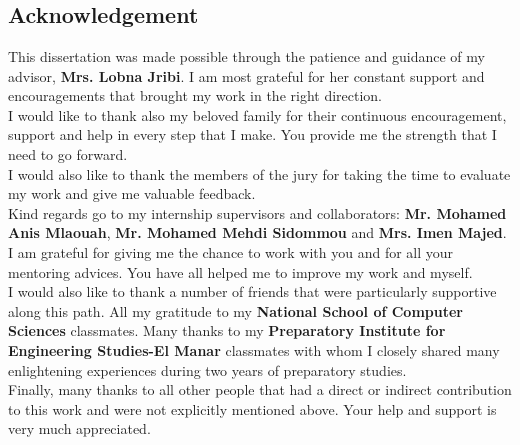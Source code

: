 \chapter*{}



\hskip7mm



\begin{center}
\section*{Acknowledgement}

\end{center}

\begin{spacing}{1.3}
This dissertation was made possible through the patience and guidance of my advisor, \textbf{Mrs. Lobna Jribi}. I am most grateful for her constant support and encouragements that brought my work in the right direction.\\

I would like to thank also my beloved family for their continuous encouragement, support and help in every step that I make. You provide me the strength that I need to go forward.\\

I would also like to thank the members of the jury for taking the time to evaluate my work and give me valuable feedback.\\

Kind regards go to my internship supervisors and collaborators: \textbf{Mr. Mohamed Anis Mlaouah}, \textbf{Mr. Mohamed Mehdi Sidommou} and \textbf{Mrs. Imen Majed}. I am grateful for giving me the chance to work with you and for all your mentoring advices. You have all helped me to improve my work and myself.\\

I would also like to thank a number of friends that were particularly supportive along this path. All my gratitude to my \textbf{National School of Computer Sciences} classmates. Many thanks to my \textbf{Preparatory Institute for Engineering Studies-El Manar} classmates with whom I closely shared many enlightening experiences during two years of preparatory studies.\\

Finally, many thanks to all other people that had a direct or indirect contribution to this work and were not explicitly mentioned above. Your help and support is very much appreciated.\\
\end{spacing}
